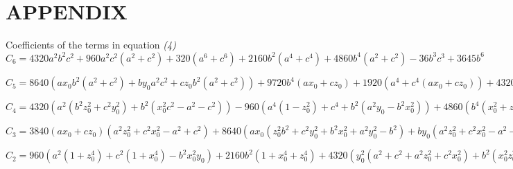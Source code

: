 \chapter{APPENDIX} %

\label{Appendix} %


Coefficients of the terms in equation \textit{(4)} \\

$C_6  = 4320a^2b^2c^2 + 960a^2c^2(a^2 + c^2) + 320(a^6 + c^6) + 2160b^2(a^4 + c^4) + 4860b^4(a^2 
+ c^2) - 36b^3c^3 + 3645b^6$
  
$C_5  = 8640(ax_0b^2(a^2 + c^2) + by_0a^2c^2  + cz_0b^2(a^2 + c^2)) + 9720b^4(ax_0 + cz_0) + 1920(a^4 
+ c^4(ax_0 + cz_0)) + 4320(a^4 + c^4by_0) + 3840(a^2 + c^2)(ax_0 + cz_0) + 19440(c^2b^2 + ab^2) 
by_0 -­ 108bc(c^2by_0 + cz_0b^2) -­ 320a^2ba^3 + 21870y_0b^5$  

$C_4  = 4320(a^2(b^2z_0^2 + c^2y_0^2) + b^2(x_0^2c^2 - a^2 - c^2)) -­ 960(a^4(1 -­ z_0^2) + c^4 + b^2(a^2y_0 ­- 
b^2x_0^2)) + 4860(b^4(x_0^2 + z_0^2 -­ 1)) + 4800(a^4x_0^2 + c^4z_0^2)+ 2160y_0^2(a^4 + c^4) + 
5760a^2c^2(x_0^2 + z_0^2) + 7680ax_0cz_0(a^2 + c^2) + 17280((ax_0by_0 + by_0cz_0 )(a^2 + c^2) + 
ax_0cz_0b^2) + 12960b^2(a^4x_0^2 + c^4z_0^2) + 29160b^2y_0^2(a^2 + c^2) -­ 108bc(b^2z_0^2 + c^2y_0^2)
- 1920a^2c^2 -­ 54675y_0^2b^4 -­ 324z_0c^2b^2y_0 - 640ax_0b^3$    

$C_3 = 3840(ax_0 + cz_0)(a^2z_0^2 + c^2x_0^2 - a^2 + c^2) + 8640(ax_0(z_0^2b^2 + c^2y_0^2 + b^2x_0^2 + 
a^2y_0^2 -­ b^2) + by_0(a^2z_0^2 + c^2x_0^2 - a^2 - c^2) + cz_0(a^2y_0^2 + b^2x_0^2 + bz_0^2 + c^2y_0^2 - ­ b^2)) + 6400 
(a^3x_0^3 + c^3z_0^3) + 19440by_0(b^2(x_0^2 + z_0^2 -­ 1) + y_0^2(a^2 + c^2)) -­ 36(b^3z_0^3 + c^3y_0^3 ) + 
11520(ax_0cz_0(ax_0 + cz_0))­ - 324by_0cz_0(bz_0 + c + y_0) + 25920by_0(z_0^2c^2 + x_0^2a^2) ­- 
320x_0^2b^3  + 72900y_0^3b^3 + 34560ax_0by_0cz_0 + 58320ax_0b^2y_0^2 -­ 1920ax_0b^2y_0 + 
58320cz_0b^2y_0  -­ 960a^2by_0^2$

$C_2 = 960(a^2(1 + z_0^4) +  c^2(1 + x_0^4) - b^2x_0^2y_0) + 2160b^2(1 + x_0^4 + z_0^4) + 4320(y_0^2( 
a^2 + c^2 + a^2z_0^2 + c^2x_0^2) + b^2(x_0^2z_0^2 - x_0^2­ - z_0^2)) + 4800(x_0^3a^2 + z_0^3c^2)
 + 4860y_0^4(a^2 + c^2) + 5760(z_0^2c^2(1 + x_0^2) + x_0^2a^2(z_0^2 - ­1)) + 7680ax_0cz_0(x_0^2 + z_0^2 - 1­ - 1920(a^2z_0^2 + c^2x_0^2 + ax_0y_0^2b) + 17280(by_0(ax_0^3 - ax_0 + cz_0^3 -­ cz_0 + az_0^2) + ax_0cz_0y_0^2) + 38880bz_0^3(ax_0 + cz_0) + 12960y_0^2(a^2x_0^2 ­- c^2z_0^2) + 
29160b^2y_0^2(x_0^2 + z_0^2 -­ 1) ­- 180y_0z_0c^2y_0^2 + b^2z_0^2) ­- 320a^2y_0^3 + 54675y_0^3b^2$  


